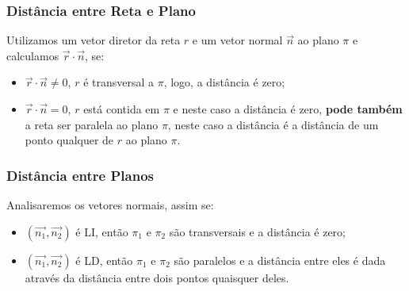 \documentclass[hyperref={pdfpagelabels=false}]{beamer}
\begin{document}
\begin{frame}
\frametitle{Distância entre Reta e Plano}

Utilizamos um vetor diretor da reta $r$ e um vetor normal $\overrightarrow{n}$ ao plano $\pi$ e calculamos $\overrightarrow{r}\cdot \overrightarrow{n}$, se:
\begin{itemize}
	\item $\overrightarrow{r}\cdot \overrightarrow{n} \neq 0$, $r$ é transversal a $\pi$, logo, a distância é zero;
	\item $\overrightarrow{r}\cdot \overrightarrow{n} = 0$, $r$ está contida em $\pi$ e neste caso a distância é zero, {\bf pode também} a reta ser paralela ao plano $\pi$, neste caso a distância é a distância de um ponto qualquer de $r$ ao plano $\pi$.
\end{itemize} 

\end{frame}

\begin{frame}
\frametitle{Distância entre Planos}

Analisaremos os vetores normais, assim se:
\begin{itemize}
	\item $(\overrightarrow{n_1},\overrightarrow{n_2})$ é LI, então $\pi_1$ e $\pi_2$ são transversais e a distância é zero;
	\item $(\overrightarrow{n_1},\overrightarrow{n_2})$ é LD, então $\pi_1$ e $\pi_2$ são paralelos e a distância entre eles é dada através da distância entre dois pontos quaisquer deles.
\end{itemize}

\end{frame}
\end{document}
